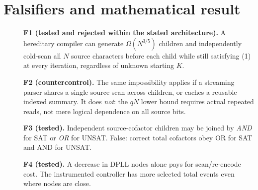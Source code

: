 \documentclass[11pt]{article}
\begin{document}
\section{Falsifiers and mathematical result}
\begin{description}
\item[] \textbf{F1 (tested and rejected within the stated architecture).} A hereditary compiler can generate $\Omega(N^{3/5})$ children and independently cold-scan all $N$ source characters before each child while still satisfying (1) at every iteration, regardless of unknown starting $K$.
\item[] \textbf{F2 (countercontrol).} The same impossibility applies if a streaming parser shares a single source scan across children, or caches a reusable indexed summary. It does \emph{not}: the $qN$ lower bound requires actual repeated reads, not mere logical dependence on all source bits.
\item[] \textbf{F3 (tested).} Independent source-cofactor children may be joined by \emph{AND} for SAT or \emph{OR} for UNSAT. False: correct total cofactors obey OR for SAT and AND for UNSAT.
\item[] \textbf{F4 (tested).} A decrease in DPLL nodes alone pays for scan/re-encode cost. The instrumented controller has more selected total events even where nodes are close.
\end{description}
\end{document}
